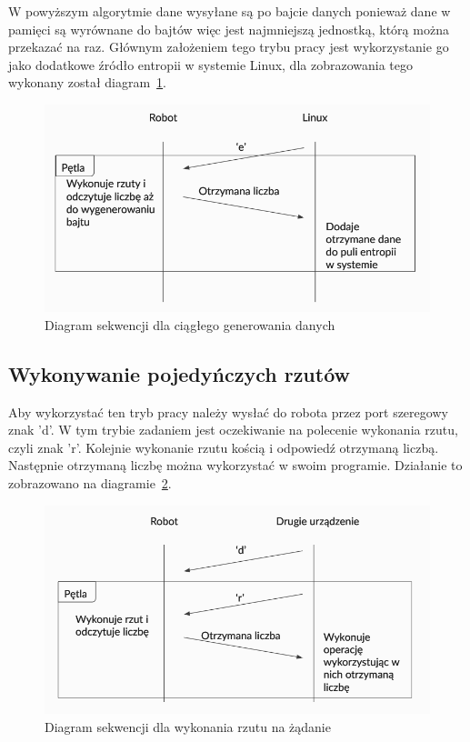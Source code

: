 W powyższym algorytmie dane wysyłane są po bajcie danych ponieważ dane w pamięci 
są wyrównane do bajtów więc jest najmniejszą jednostką, którą można przekazać na raz.
Głównym założeniem tego trybu pracy jest wykorzystanie go jako dodatkowe źródło entropii w systemie Linux, 
dla zobrazowania tego wykonany został diagram~\ref{fig:interface_a}.

\begin{figure}[H]
    \centering
    \includegraphics[width=0.5\linewidth]{chapters/05-Przetwarzanie Wyniku/figures/InterfaceA}
    \caption{Diagram sekwencji dla ciągłego generowania danych}
    \label{fig:interface_a}
\end{figure}

\subsection{Wykonywanie pojedyńczych rzutów}
Aby wykorzystać ten tryb pracy należy wysłać do robota przez port szeregowy znak 'd'.
W tym trybie zadaniem jest oczekiwanie na polecenie wykonania rzutu, czyli znak 'r'.
Kolejnie wykonanie rzutu kością i odpowiedź otrzymaną liczbą. Następnie otrzymaną liczbę można wykorzystać w swoim programie. Działanie to zobrazowano na diagramie~\ref{fig:interface_b}.

\begin{figure}[H]
    \centering
    \includegraphics[width=0.5\linewidth]{chapters/05-Przetwarzanie Wyniku/figures/InterfaceB}
    \caption{Diagram sekwencji dla wykonania rzutu na żądanie}
    \label{fig:interface_b}
\end{figure}

